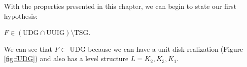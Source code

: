 With the properties presented in this chapter, we can begin to state our first hypothesis:

\begin{hyp}
  $F \in (\text{UDG}\cap\text{UUIG}) \setminus \text{TSG}$.
\end{hyp}

We can see that $F \in$ UDG because we can have a unit disk realization (Figure \ref{fig:fUDG}) and also has a level structure $L = {K_2, K_3, K_1}$.
